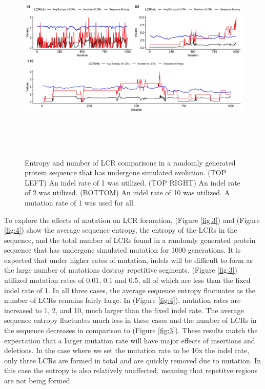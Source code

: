 \documentclass[10pt]{article}
\providecommand{\figref}[1]{(Figure \ref{#1})}  %
\begin{document}
\begin{figure}[H]
	\includegraphics[width=18cm, height=10cm]{im1-2-10.jpeg}
	\caption{Entropy and number of LCR comparisons in a randomly generated protein sequence that has undergone simulated evolution. (TOP LEFT) An indel rate of 1 was utilized. (TOP RIGHT) An indel rate of 2 was utilized. (BOTTOM) An indel rate of 10 was utilized. A mutation rate of 1 was used for all.}
	\label{fig:2}
\end{figure}

To explore the effects of mutation on LCR formation, \figref{fig:3} and \figref{fig:4} show the average sequence entropy, the entropy of the LCRs in the sequence, and the total number of LCRs found in a randomly generated protein sequence that has undergone simulated mutation for 1000 generations. It is expected that under higher rates of mutation, indels will be difficult to form as the large number of mutations destroy repetitive segments. \figref{fig:3} utilized mutation rates of 0.01, 0.1 and 0.5, all of which are less than the fixed indel rate of 1. In all three cases, the average sequence entropy fluctuates as the number of LCRs remains fairly large. In \figref{fig:4}, mutation rates are increased to 1, 2, and 10, much larger than the fixed indel rate. The average sequence entropy fluctuates much less in these cases and the number of LCRs in the sequence decreases in comparison to \figref{fig:3}. These results match the expectation that a larger mutation rate will have major effects of insertions and deletions. In the case where we set the mutation rate to be 10x the indel rate, only three LCRs are formed in total and are quickly removed due to mutation. In this case the entropy is also relatively unaffected, meaning that repetitve regions are not being formed.
\end{document}
